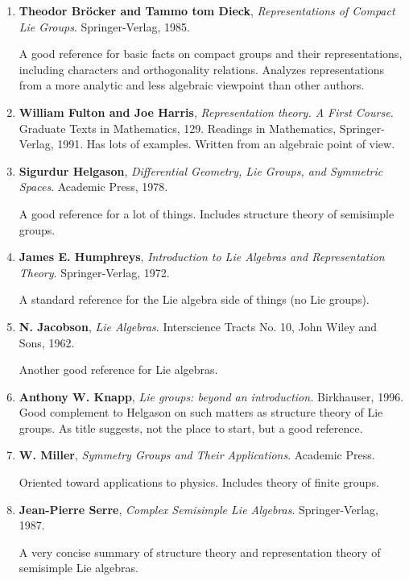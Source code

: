 \documentclass[12pt]{amsbook}
\theoremstyle{plain}
\numberwithin{equation}{chapter}
\numberwithin{theorem}{chapter}
\begin{document}
\begin{enumerate}
\item \textbf{Theodor Br\"{o}cker and Tammo tom Dieck},
\textit{Representations of Compact Lie Groups}. Springer-Verlag, 1985.

A good reference for basic facts on compact groups and their representations,
including characters and orthogonality relations. Analyzes representations
from a more analytic and less algebraic viewpoint than other authors.

\item \textbf{William Fulton and Joe Harris}, \textit{Representation theory. A
First Course.} Graduate Texts in Mathematics, 129. Readings in Mathematics,
Springer-Verlag, 1991. Has lots of examples. Written from an algebraic point
of view.

\item \textbf{Sigurdur Helgason}, \textit{Differential Geometry, Lie Groups,
and Symmetric Spaces}. Academic Press, 1978.

A good reference for a lot of things. Includes structure theory of semisimple groups.

\item \textbf{James E. Humphreys}, \textit{Introduction to Lie Algebras and
Representation Theory}. Springer-Verlag, 1972.

A standard reference for the Lie algebra side of things (no Lie groups).

\item \textbf{N. Jacobson}, \textit{Lie Algebras}. Interscience Tracts No. 10,
John Wiley and Sons, 1962.

Another good reference for Lie algebras.

\item \textbf{Anthony W. Knapp}, \textit{Lie groups: beyond an introduction.}
Birkhauser, 1996. Good complement to Helgason on such matters as structure
theory of Lie groups. As title suggests, not the place to start, but a good reference.

\item \textbf{W. Miller}, \textit{Symmetry Groups and Their Applications}.
Academic Press.

Oriented toward applications to physics. Includes theory of finite groups.

\item \textbf{Jean-Pierre Serre}, \textit{Complex Semisimple Lie Algebras}.
Springer-Verlag, 1987.

A very concise summary of structure theory and representation theory of
semisimple Lie algebras.


\end{enumerate}
\end{document}
